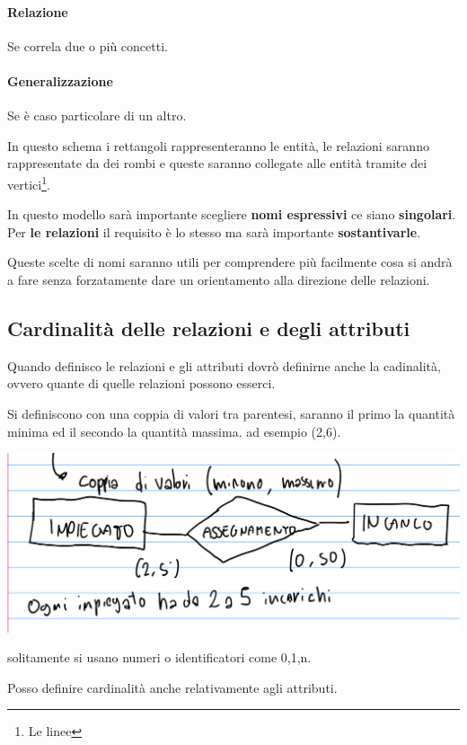 \paragraph{Relazione} Se correla due o più concetti.
\paragraph{Generalizzazione} Se è caso particolare di un altro.


In questo schema i rettangoli rappresenteranno le entità, le relazioni saranno rappresentate da dei rombi e queste saranno collegate alle entità tramite dei vertici\footnote{Le linee}.

In questo modello sarà importante scegliere \textbf{nomi espressivi} ce siano \textbf{singolari}. Per \textbf{le relazioni} il requisito è lo stesso ma sarà importante \textbf{sostantivarle}.

Queste scelte di nomi saranno utili per comprendere più facilmente cosa si andrà a fare senza forzatamente dare un orientamento alla direzione delle relazioni.

\subsection{Cardinalità delle relazioni e degli attributi}

Quando definisco le relazioni e gli attributi dovrò definirne anche la cadinalità, ovvero quante di quelle relazioni possono esserci.


Si definiscono con una coppia di valori tra parentesi, saranno il primo la quantità minima ed il secondo la quantità massima. ad esempio (2,6).

\includegraphics[width = \textwidth]{img/cardinalita_relazioni.png}

solitamente si usano numeri o identificatori come 0,1,n.

Posso definire cardinalità anche relativamente agli attributi.

